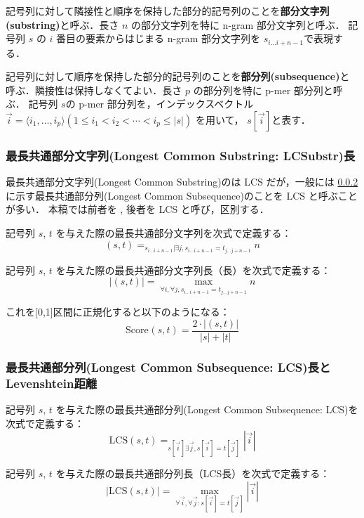 \documentclass[japanese]{jnlp_1.4}
\newcommand{\argmax}{}
\newcommand{\modified}[1]{}
\begin{document}
記号列に対して隣接性と順序を保持した部分的記号列のことを{\bf 部分文字列(substring)}と呼ぶ．長さ $n$ の部分文字列を特に n-gram 部分文字列と呼ぶ．
  記号列 $s$ の $i$ 番目の要素からはじまる n-gram 部分文字列を 
$s_{i \ldots i + n - 1}$で表現する．

記号列に対して順序を保持した部分的記号列のことを{\bf 部分列(subsequence)}と呼ぶ．隣接性は保持しなくてよい．長さ $p$ の部分列を特に p-mer 部分列と呼ぶ．
  記号列 $s$の p-mer 部分列を，インデックスベクトル $\vec{i}=\langle i_{1},\ldots,i_{p}\rangle (1\leq i_{1} < i_{2} < \cdots < i_{p} \leq |s|)$ を用いて，
  $s[\vec{i}]$と表す．


\subsubsection{最長共通部分文字列(Longest Common Substring: LCSubstr)長}
\label{sss:LCStr}

最長共通部分文字列(Longest Common Substring)の\modified{略称}は LCS だが，一般には
\ref{sss:LCS}\modified{節}に示す最長共通部分列(Longest Common Subsequence)のことを LCS と呼ぶことが多い．
本稿では前者を \modified{LCSubstr}, 後者を LCS と呼び，区別する．

記号列 $s$, $t$ を与えた際の最長共通部分文字列を次式で定義する：
\[
\mbox{\modified{LCSubstr}}(s,t) = \argmax_{s_{i \ldots i+n-1} | \exists j, s_{i
\ldots i+n-1} = t_{j \ldots j+n-1}} n
\]

記号列 $s$, $t$ を与えた際の最長共通部分文字列長（\modified{LCSubstr}長）を次式で定義する：
\[
|\mbox{\modified{LCSubstr}}(s,t)| = \max_{\forall i, \forall j, s_{i \ldots
i+n-1} = t_{j \ldots j+n-1}} n 
\]

これを[0,1]区間に正規化すると以下のようになる：
\[
\mbox{Score}_{\mbox{\modified{LCSubstr}}}(s,t) = \frac{2 \cdot |\mbox{\modified{LCSubstr}}(s,t)|}{|s|+|t|}
\]


\subsubsection{最長共通部分列(Longest Common Subsequence: LCS)長とLevenshtein距離}
\label{sss:LCS}\label{para:Levenshtein}

記号列 $s$, $t$ を与えた際の最長共通部分列(Longest Common Subsequence: LCS)を次式で定義する：
\[
\mbox{LCS}(s,t) = \argmax_{s[\vec{i}]\exists \vec{j}, s[\vec{i}]=t[\vec{j}]} |\vec{i}| 
\]

記号列 $s$, $t$ を与えた際の最長共通部分列長（LCS長）を次式で定義する：
\[
|\mbox{LCS}(s,t)| = \max_{\forall \vec{i}, \forall \vec{j}: s[\vec{i}]=t[\vec{j}]} |\vec{i}| 
\]
\end{document}
